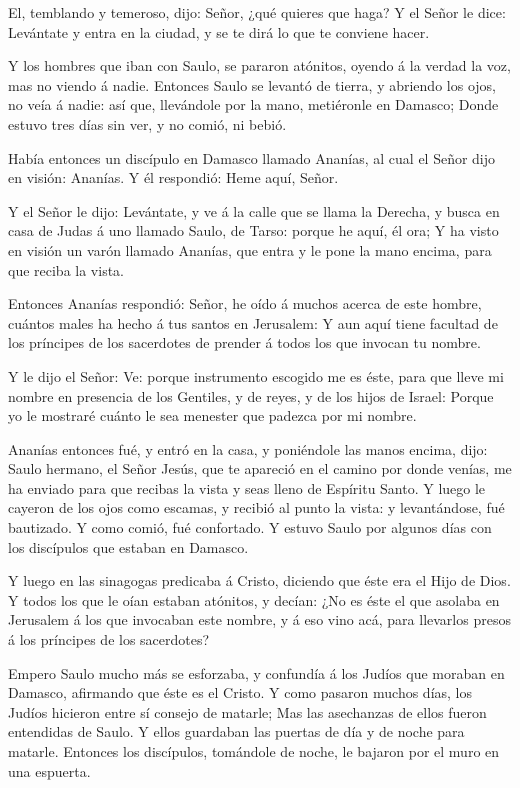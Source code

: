  El, temblando y temeroso, dijo: Señor, ¿qué quieres que
haga? Y el Señor le dice: Levántate y entra en la ciudad, y se te dirá
lo que te conviene hacer.

 Y los hombres que iban con Saulo, se pararon atónitos,
oyendo á la verdad la voz, mas no viendo á nadie.  Entonces
Saulo se levantó de tierra, y abriendo los ojos, no veía á nadie: así
que, llevándole por la mano, metiéronle en Damasco;  Donde
estuvo tres días sin ver, y no comió, ni bebió.

 Había entonces un discípulo en Damasco llamado Ananías, al
cual el Señor dijo en visión: Ananías. Y él respondió: Heme aquí, Señor.

 Y el Señor le dijo: Levántate, y ve á la calle que se
llama la Derecha, y busca en casa de Judas á uno llamado Saulo, de
Tarso: porque he aquí, él ora;  Y ha visto en visión un
varón llamado Ananías, que entra y le pone la mano encima, para que
reciba la vista.

 Entonces Ananías respondió: Señor, he oído á muchos acerca
de este hombre, cuántos males ha hecho á tus santos en Jerusalem:
 Y aun aquí tiene facultad de los príncipes de los
sacerdotes de prender á todos los que invocan tu nombre.

 Y le dijo el Señor: Ve: porque instrumento escogido me es
éste, para que lleve mi nombre en presencia de los Gentiles, y de reyes,
y de los hijos de Israel:  Porque yo le mostraré cuánto le
sea menester que padezca por mi nombre.

 Ananías entonces fué, y entró en la casa, y poniéndole las
manos encima, dijo: Saulo hermano, el Señor Jesús, que te apareció en el
camino por donde venías, me ha enviado para que recibas la vista y seas
lleno de Espíritu Santo.  Y luego le cayeron de los ojos
como escamas, y recibió al punto la vista: y levantándose, fué
bautizado.  Y como comió, fué confortado. Y estuvo Saulo
por algunos días con los discípulos que estaban en Damasco.

 Y luego en las sinagogas predicaba á Cristo, diciendo que
éste era el Hijo de Dios.  Y todos los que le oían estaban
atónitos, y decían: ¿No es éste el que asolaba en Jerusalem á los que
invocaban este nombre, y á eso vino acá, para llevarlos presos á los
príncipes de los sacerdotes?

 Empero Saulo mucho más se esforzaba, y confundía á los
Judíos que moraban en Damasco, afirmando que éste es el Cristo.
 Y como pasaron muchos días, los Judíos hicieron entre sí
consejo de matarle;  Mas las asechanzas de ellos fueron
entendidas de Saulo. Y ellos guardaban las puertas de día y de noche
para matarle.  Entonces los discípulos, tomándole de noche,
le bajaron por el muro en una espuerta.

